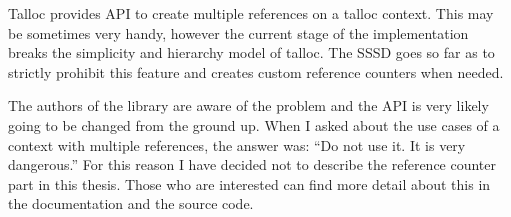 Talloc provides API to create multiple references on a talloc context. This may
be sometimes very handy, however the current stage of the implementation breaks
the simplicity and hierarchy model of talloc. The SSSD goes so far as to
strictly prohibit this feature and creates custom reference counters when
needed.

The authors of the library are aware of the problem and the API is very likely
going to be changed from the ground\cite{MailListReferences} up. When I asked
about the use cases of a context with multiple references, the answer was: ``Do
not use it. It is very dangerous.'' For this reason I have decided not to
describe the reference counter part in this thesis. Those who are interested can
find more detail about this in the documentation\cite{TallocDocReferences} and
the source code.
